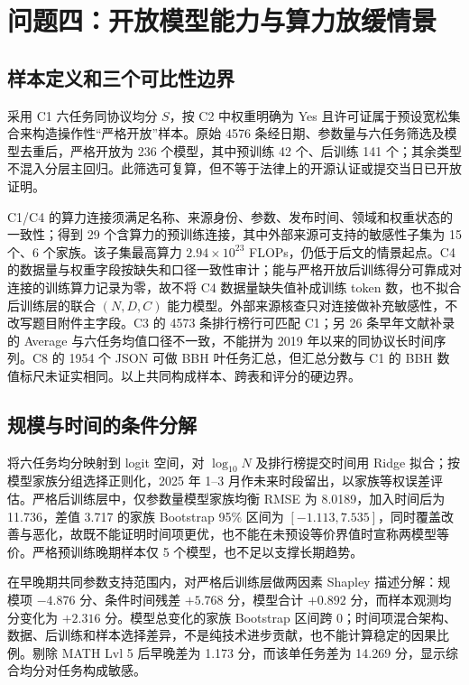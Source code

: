 \section{问题四：开放模型能力与算力放缓情景}
\subsection{样本定义和三个可比性边界}
采用 C1 六任务同协议均分 $S$，按 C2 中权重明确为 Yes 且许可证属于预设宽松集合来构造操作性“严格开放”样本。原始 4576 条经日期、参数量与六任务筛选及模型去重后，严格开放为 236 个模型，其中预训练 42 个、后训练 141 个；其余类型不混入分层主回归。此筛选可复算，但不等于法律上的开源认证或提交当日已开放证明。

C1/C4 的算力连接须满足名称、来源身份、参数、发布时间、领域和权重状态的一致性；得到 29 个含算力的预训练连接，其中外部来源可支持的敏感性子集为 15 个、6 个家族。该子集最高算力 $2.94\times10^{23}$ FLOPs，仍低于后文的情景起点。C4 的数据量与权重字段按缺失和口径一致性审计；能与严格开放后训练得分可靠成对连接的训练算力记录为零，故不将 C4 数据量缺失值补成训练 token 数，也不拟合后训练层的联合 $(N,D,C)$ 能力模型。外部来源核查只对连接做补充敏感性，不改写题目附件主字段。C3 的 4573 条排行榜行可匹配 C1；另 26 条早年文献补录的 Average 与六任务均值口径不一致，不能拼为 2019 年以来的同协议长时间序列。C8 的 1954 个 JSON 可做 BBH 叶任务汇总，但汇总分数与 C1 的 BBH 数值标尺未证实相同。以上共同构成样本、跨表和评分的硬边界。


\subsection{规模与时间的条件分解}
将六任务均分映射到 logit 空间，对 $\log_{10}N$ 及排行榜提交时间用 Ridge 拟合；按模型家族分组选择正则化，2025 年 1--3 月作未来时段留出，以家族等权误差评估。严格后训练层中，仅参数量模型家族均衡 RMSE 为 8.0189，加入时间后为 11.736，差值 3.717 的家族 Bootstrap 95\% 区间为 $[-1.113,7.535]$，同时覆盖改善与恶化，故既不能证明时间项更优，也不能在未预设等价界值时宣称两模型等价。严格预训练晚期样本仅 5 个模型，也不足以支撑长期趋势。

在早晚期共同参数支持范围内，对严格后训练层做两因素 Shapley 描述分解：规模项 $-4.876$ 分、条件时间残差 $+5.768$ 分，模型合计 $+0.892$ 分，而样本观测均分变化为 $+2.316$ 分。模型总变化的家族 Bootstrap 区间跨 0；时间项混合架构、数据、后训练和样本选择差异，不是纯技术进步贡献，也不能计算稳定的因果比例。剔除 MATH Lvl 5 后早晚差为 1.173 分，而该单任务差为 14.269 分，显示综合均分对任务构成敏感。

